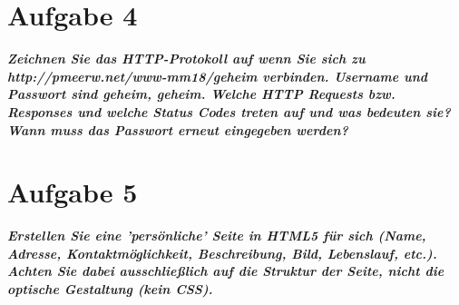 \documentclass[12pt, a4paper]{report}
\begin{document}
\section*{Aufgabe 4}
\textbf{\textit{Zeichnen Sie das HTTP-Protokoll auf wenn Sie sich zu http://pmeerw.net/www-mm18/geheim verbinden. Username und Passwort sind geheim, geheim. Welche HTTP Requests bzw. Responses und welche Status Codes treten auf und was bedeuten sie? Wann muss das Passwort erneut eingegeben werden?}}\\

\section*{Aufgabe 5}
\textbf{\textit{Erstellen Sie eine ’persönliche’ Seite in HTML5 für sich (Name, Adresse, Kontaktmöglichkeit, Beschreibung, Bild, Lebenslauf, etc.). Achten Sie dabei ausschließlich auf die Struktur der Seite, nicht die optische Gestaltung (kein CSS).}}
\end{document}
